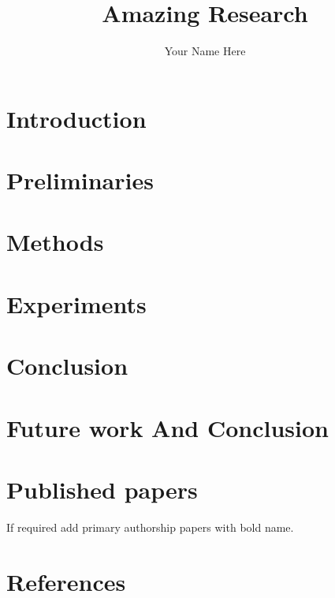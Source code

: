 \documentclass[12pt, letterpaper, center, noupper]{uconnthesis}
\begin{document}
\title{Amazing Research}
\author{Your Name Here}











\maketitle



\frontmatter

\tableofcontents
\listoffigures
\listoftables

\mainmatter

\chapter{Introduction}

\chapter{Preliminaries}


\chapter{Methods}


\chapter{Experiments}

\chapter{Conclusion}




\chapter{Future work And Conclusion}



\chapter{Published papers}

If required add primary authorship papers with bold name.






\chapter*{References}


\end{document}
